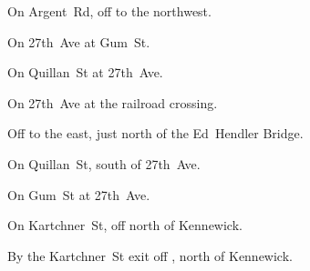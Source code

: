 
\begin{LocationList}

On Argent~Rd, off   to the northwest.

\Location{\GarageHQ \Garage}
On 27th~Ave at  Gum~St.

On Quillan~St at 27th~Ave.

On 27th~Ave at the railroad crossing.

Off  to the east, just north of the Ed~Hendler Bridge.

On Quillan~St, south of 27th~Ave.

On  Gum~St at 27th~Ave.

On Kartchner~St, off  north of Kennewick.

\Location{\TruckStop \Gas \Rest \Weigh}
By the Kartchner~St exit off , north of Kennewick.

\end{LocationList}
